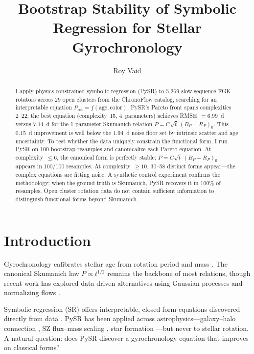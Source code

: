 \documentclass[RNAAS]{aastex7}
\begin{document}
\title{Bootstrap Stability of Symbolic Regression for Stellar Gyrochronology}

\author{Roy Vaid}

\begin{abstract}
I apply physics-constrained symbolic regression (PySR) to 5,269 slow-sequence FGK rotators across 29 open clusters from the ChronoFlow catalog, searching for an interpretable equation $P_\mathrm{rot} = f(\mathrm{age}, \mathrm{color})$.
PySR's Pareto front spans complexities 2--22; the best equation (complexity~15, 4~parameters) achieves RMSE~$= 6.99$~d versus $7.14$~d for the 1-parameter Skumanich relation $P = C\sqrt{t}\,(B_P - R_P)_0$.
This $0.15$~d improvement is well below the $1.94$~d noise floor set by intrinsic scatter and age uncertainty.
To test whether the data uniquely constrain the functional form, I run PySR on 100 bootstrap resamples and canonicalize each Pareto equation.
At complexity~$\leq 6$, the canonical form is perfectly stable: $P = C\sqrt{t}\,(B_P - R_P)_0$ appears in 100/100 resamples.
At complexity~$\geq 10$, 30--58 distinct forms appear---the complex equations are fitting noise.
A synthetic control experiment confirms the methodology: when the ground truth is Skumanich, PySR recovers it in 100\% of resamples.
Open cluster rotation data do not contain sufficient information to distinguish functional forms beyond Skumanich.
\end{abstract}


\section{Introduction}

Gyrochronology calibrates stellar age from rotation period and mass \citep{Barnes2007, MamajekHillenbrand2008}.
The canonical Skumanich law $P \propto t^{1/2}$ \citep{Skumanich1972} remains the backbone of most relations, though recent work has explored data-driven alternatives using Gaussian processes \citep{LuAngus2024} and normalizing flows \citep{VanLane2025}.

Symbolic regression (SR) offers interpretable, closed-form equations discovered directly from data \citep{Cranmer2023}.
PySR has been applied across astrophysics---galaxy--halo connection \citep{Cranmer2020}, SZ flux--mass scaling \citep{Wadekar2023}, star formation \citep{Salim2025}---but never to stellar rotation.
A natural question: does PySR discover a gyrochronology equation that improves on classical forms?
\end{document}
